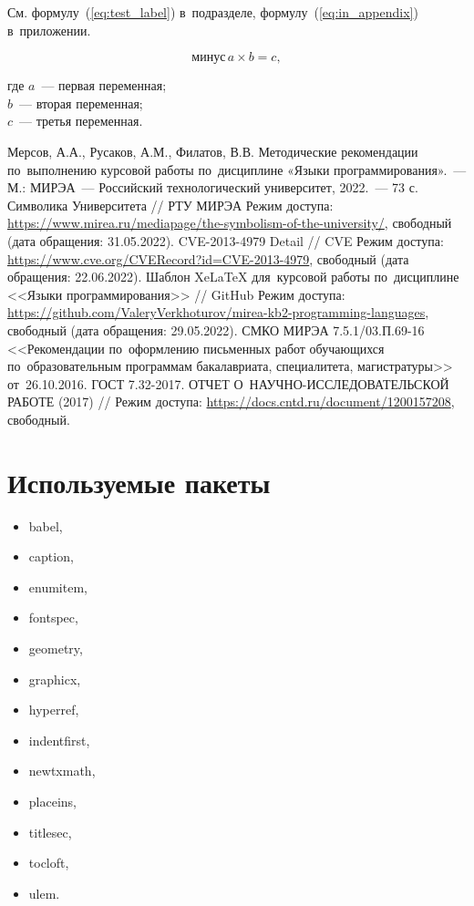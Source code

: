 \documentclass{SIBGU-state}
\begin{document}
См. формулу~(\ref{eq:test_label}) в~подразделе, формулу~(\ref{eq:in_appendix}) в~приложении.

\begin{equation}\label{eq:test_label}
	\text{минус}\,a\times b=c ,
\end{equation}

где $a$~--- первая переменная; \\
$b$~--- вторая переменная; \\
$c$~--- третья переменная.



\begin{thebibliography}{99\kern\bibindent}
	 Мерсов, А.А., Русаков, А.М., Филатов, В.В. Методические рекомендации по~выполнению курсовой работы по~дисциплине «Языки программирования».~--- М.: МИРЭА~--- Российский технологический университет, 2022.~--- 73 с.
	 Символика Университета // РТУ МИРЭА Режим доступа: \url{https://www.mirea.ru/mediapage/the-symbolism-of-the-university/}, свободный (дата обращения: 31.05.2022).
	 CVE-2013-4979 Detail // CVE Режим доступа: \url{https://www.cve.org/CVERecord?id=CVE-2013-4979}, свободный (дата обращения: 22.06.2022).
	 Шаблон XeLaTeX для~курсовой работы по~дисциплине <<Языки программирования>> // GitHub Режим доступа: \url{https://github.com/ValeryVerkhoturov/mirea-kb2-programming-languages}, свободный (дата обращения: 29.05.2022).
	 СМКО МИРЭА 7.5.1/03.П.69-16 <<Рекомендации по~оформлению письменных работ обучающихся по~образовательным программам бакалавриата, специалитета, магистратуры>> от~26.10.2016.
	 ГОСТ 7.32-2017. ОТЧЕТ О~НАУЧНО-ИССЛЕДОВАТЕЛЬСКОЙ РАБОТЕ (2017) // Режим доступа: \url{https://docs.cntd.ru/document/1200157208}, свободный.
\end{thebibliography}


\appendix

\section{Используемые пакеты}
\label{appendix:used_packages}

\begin{itemize}
	\item babel,
	\item caption,
	\item enumitem,
	\item fontspec,
	\item geometry,
	\item graphicx,
	\item hyperref,
	\item indentfirst,
	\item newtxmath,
	\item placeins,
	\item titlesec,
	\item tocloft,
	\item ulem.
\end{itemize}
\end{document}

